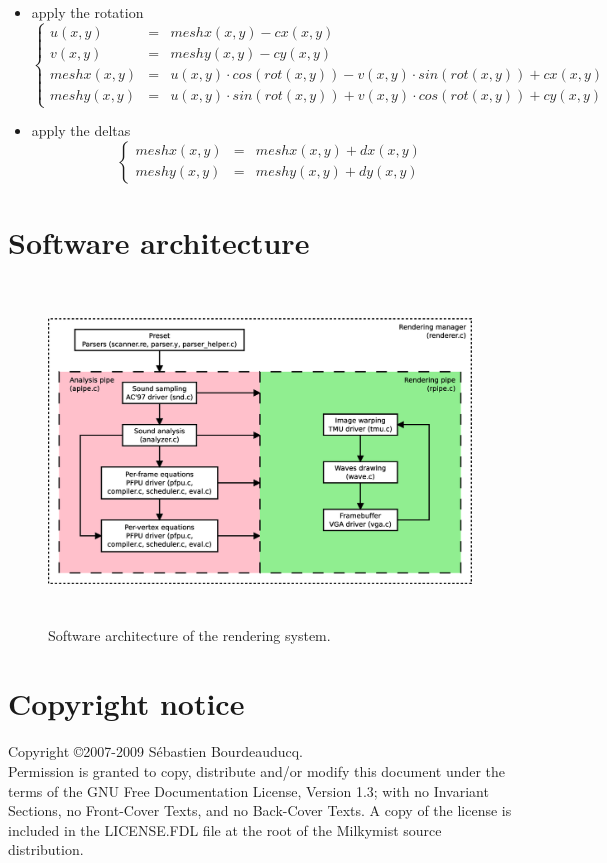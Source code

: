 \documentclass[a4paper,11pt]{article}
\begin{document}
\begin{itemize}
\item apply the rotation
\[
\left\{ \begin{array}{rrlr}
u(x, y) & = & meshx(x, y) - cx(x, y) \\
v(x, y) & = & meshy(x, y) - cy(x, y) \\
meshx(x, y) & = & u(x, y) \cdot cos(rot(x, y)) - v(x, y) \cdot sin(rot(x, y)) + cx(x, y) \\
meshy(x, y) & = & u(x, y) \cdot sin(rot(x, y)) + v(x, y) \cdot cos(rot(x, y)) + cy(x, y)
\end{array}
\right.
\]

\item apply the deltas
\[
\left\{ \begin{array}{rrlr}
meshx(x, y) & = & meshx(x, y) + dx(x, y)\\
meshy(x, y) & = & meshy(x, y) + dy(x, y)
\end{array}
\right.
\]

\end{itemize}

\section{Software architecture}
\begin{figure}[htp]
\centering
\includegraphics[height=90mm]{swarch.eps}
\caption{Software architecture of the rendering system.}\label{fig:swarch}
\end{figure}

\section*{Copyright notice}
Copyright \copyright 2007-2009 S\'ebastien Bourdeauducq. \\
Permission is granted to copy, distribute and/or modify this document under the terms of the GNU Free Documentation License, Version 1.3; with no Invariant Sections, no Front-Cover Texts, and no Back-Cover Texts. A copy of the license is included in the LICENSE.FDL file at the root of the Milkymist source distribution.
\end{document}
